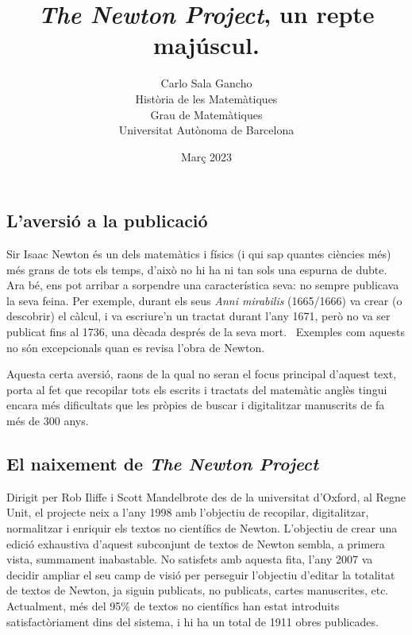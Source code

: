 \documentclass[a4paper, 11pt]{article}
\title{\textit{The Newton Project}, un repte majúscul.}
\author{
  Carlo Sala Gancho\\
  Història de les Matemàtiques\\
  Grau de Matemàtiques\\
  Universitat Autònoma de Barcelona}
\date{Març 2023}
\begin{document}
\maketitle

\subsection*{L'aversió a la publicació}

Sir Isaac Newton és un dels matemàtics i físics (i qui sap quantes ciències més) més grans de tots els temps, d'això no
hi ha ni tan sols una espurna de dubte. Ara bé, ens pot arribar a sorpendre una característica seva: no sempre
publicava la seva feina. Per exemple, durant els seus \textit{Anni mirabilis} (1665/1666) va crear (o descobrir) el
càlcul, i va escriure'n un tractat durant l'any 1671, però no va ser publicat fins al 1736, una dècada després de la
seva mort.~\cite{bib:methodfluxions} Exemples com aquests no són excepcionals quan es revisa l'obra de Newton.

Aquesta certa aversió, raons de la qual no seran el focus principal d'aquest text, porta al fet que recopilar tots els
escrits i tractats del matemàtic anglès tingui encara més dificultats que les pròpies de buscar i digitalitzar
manuscrits de fa més de 300 anys.

\subsection*{El naixement de \textit{The Newton Project}~\cite{bib:newtonproject}}

Dirigit per Rob Iliffe i Scott Mandelbrote des de la universitat d'Oxford, al Regne Unit, el projecte neix a l'any 1998
amb l'objectiu de recopilar, digitalitzar, normalitzar i enriquir els textos no científics\footnotemark{} de Newton.
L'objectiu de crear una edició exhaustiva d'aquest subconjunt de textos de Newton sembla, a primera vista, summament
inabastable. No satisfets amb aquesta fita, l'any 2007 va decidir ampliar el seu camp de visió per perseguir l'objectiu
d'editar la totalitat de textos de Newton, ja siguin publicats, no publicats, cartes manuscrites, etc. Actualment, més
del 95\% de textos no científics han estat introduits satisfactòriament dins del sistema, i hi ha un total de 1911
obres publicades.

\end{document}
